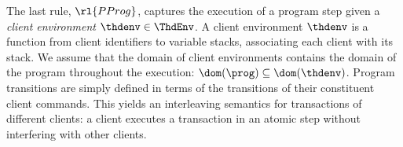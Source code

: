 The last rule, \( \rl{PProg} \), captures the execution of a program step 
given a \emph{client environment} $\thdenv \in \ThdEnv$.
A client environment $\thdenv$ is a function from client identifiers to variable stacks, associating each client with its stack. 
We assume that the domain of client environments contains 
the domain of the program throughout the execution: 
$\dom(\prog) \subseteq \dom(\thdenv)$.
Program transitions are simply defined in terms of the transitions of
their constituent client commands. 
This yields an interleaving semantics for transactions of different clients:  
a client executes a transaction in an atomic step without
interfering with other clients. 
